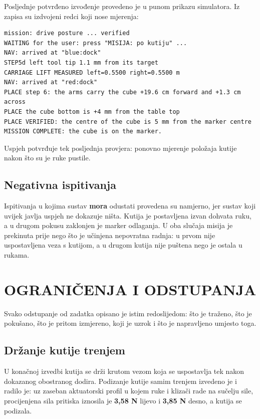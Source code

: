 \documentclass[12pt,a4paper]{article}
\begin{document}
Posljednje potvrđeno izvođenje provedeno je u punom prikazu simulatora. Iz zapisa su izdvojeni
redci koji nose mjerenja:

\begin{lstlisting}[style=log]
mission: drive posture ... verified
WAITING for the user: press "MISIJA: po kutiju" ...
NAV: arrived at "blue:dock"
STEP5d left tool tip 1.1 mm from its target
CARRIAGE LIFT MEASURED left=0.5500 right=0.5500 m
NAV: arrived at "red:dock"
PLACE step 6: the arms carry the cube +19.6 cm forward and +1.3 cm across
PLACE the cube bottom is +4 mm from the table top
PLACE VERIFIED: the centre of the cube is 5 mm from the marker centre
MISSION COMPLETE: the cube is on the marker.
\end{lstlisting}

Uspjeh potvrđuje tek posljednja provjera: ponovno mjerenje položaja kutije nakon što su je ruke
pustile.

\subsection{Negativna ispitivanja}

Ispitivanja u kojima sustav \textbf{mora} odustati provedena su namjerno, jer sustav koji uvijek
javlja uspjeh ne dokazuje ništa. Kutija je postavljena izvan dohvata ruku, a u drugom pokusu
zaklonjen je marker odlaganja. U oba slučaja misija je prekinuta prije nego što je učinjena
nepovratna radnja: u prvom nije uspostavljena veza s kutijom, a u drugom kutija nije puštena nego
je ostala u rukama.

\section{OGRANIČENJA I ODSTUPANJA}
\label{sec:ogranicenja}

Svako odstupanje od zadatka opisano je istim redoslijedom: što je traženo, što je pokušano, što je
pritom izmjereno, koji je uzrok i što je napravljeno umjesto toga.

\subsection{Držanje kutije trenjem}

U konačnoj izvedbi kutija se drži krutom vezom koja se uspostavlja tek nakon dokazanog obostranog
dodira. Podizanje kutije samim trenjem izvedeno je i radilo je: uz zaseban aktuatorski profil u
kojem ruke i klizači rade na sučelju sile, procijenjena sila pritiska iznosila je \textbf{3,58 N}
lijevo i \textbf{3,85 N} desno, a kutija se podizala.
\end{document}
